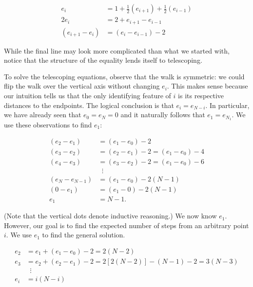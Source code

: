 \documentclass[12pt]{article}
\theoremstyle{definition}
\begin{document}
\begin{align}
e_i &= 1 + \frac{1}{2} \left(e_{i+1}\right) + \frac{1}{2}\left(e_{i-1}\right) \nonumber \\
2 e_i &= 2 + e_{i+1} - e_{i-1} \nonumber \\
\left(e_{i+1} - e_i\right) &=\left( e_i - e_{i-1}\right) - 2 \nonumber
\end{align}

While the final line may look more complicated than what we started with,
notice that the structure of the equality lends itself to telescoping.

To solve the telescoping equations, observe that the walk is symmetric:
we could flip the walk over the vertical axis without changing $e_i$.
This makes sense because our intuition tells us that the only 
identifying feature of $i$ is its respective distances to the endpoints.
The logical conclusion is that $e_i=e_{N-i}$.
In particular, we have already seen that $e_0=e_N=0$ and it
naturally follows that $e_1=e_{N_1}$.
We use these observations to find $e_1$:

\begin{align}
\left(e_{2} - e_1\right) &= \left(e_1 - e_{0}\right) - 2 \nonumber \\
\left(e_{3} - e_2\right) &= \left(e_2 - e_{1}\right) - 2 = \left(e_1 - e_{0}\right) - 4\nonumber \\
\left(e_{4} - e_3\right) &= \left(e_3 - e_{2}\right) - 2 = \left(e_1 - e_{0}\right) - 6\nonumber \\
&\;\;\vdots \nonumber\\
\left(e_N - e_{N-1}\right) &= \left(e_1 - e_0\right) - 2 (N-1) \nonumber \\
\left(0 - e_1\right) &= \left(e_1 - 0\right) - 2 (N-1) \nonumber \\
e_1 &= N-1. \nonumber
\end{align}

(Note that the vertical dots denote inductive reasoning.)
We now know $e_1$.
However, our goal is to find the expected number of steps
from an arbitrary point $i$.
We use $e_1$ to find the general solution.

\begin{align}
e_2  &= e_1 + (e_1 - e_0) - 2 = 2 (N - 2) \nonumber\\
e_3  &= e_2 + (e_2 - e_1) - 2 = 2 \left[2 (N-2) \right] - (N-1) -2 = 3 (N - 3) \nonumber\\
&\;\;\vdots \nonumber\\
e_i &= i (N-i) \label{eq:line}
\end{align}
\end{document}
